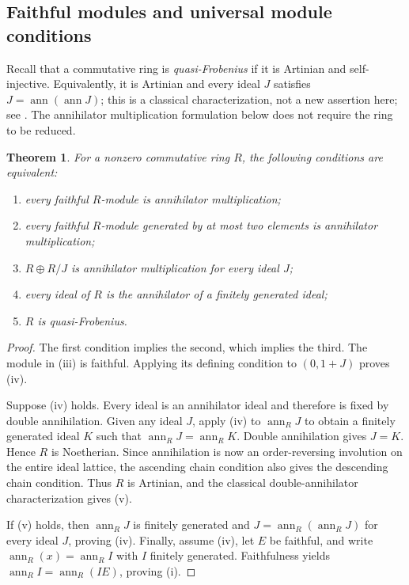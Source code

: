 \documentclass[11pt]{amsart}
\theoremstyle{plain}
\newtheorem{theorem}{Theorem}[section]
\theoremstyle{definition}
\theoremstyle{remark}
\newcommand{\ann}{\operatorname{ann}}
\numberwithin{equation}{section}
\begin{document}
\subsection{Faithful modules and universal module conditions}

Recall that a commutative ring is \emph{quasi-Frobenius} if it is
Artinian and self-injective. Equivalently, it is Artinian and every
ideal $J$ satisfies $J=\ann(\ann J)$; this is a classical
characterization, not a new assertion here; see \cite{Storrer69,Lam99}.
The annihilator multiplication formulation below does not require the
ring to be reduced.

\begin{theorem}\label{thm:faithful-qf}
For a nonzero commutative ring $R$, the following conditions are equivalent:
\begin{enumerate}[label=\textup{(\roman*)}]
\item every faithful $R$-module is annihilator multiplication;
\item every faithful $R$-module generated by at most two elements is
annihilator multiplication;
\item $R\oplus R/J$ is annihilator multiplication for every ideal $J$;
\item every ideal of $R$ is the annihilator of a finitely generated ideal;
\item $R$ is quasi-Frobenius.
\end{enumerate}
\end{theorem}

\begin{proof}
The first condition implies the second, which implies the third.
The module in (iii) is faithful. Applying its defining condition to
$(0,1+J)$ proves (iv).

Suppose (iv) holds. Every ideal is an annihilator ideal and therefore
is fixed by double annihilation. Given any ideal $J$, apply (iv) to
$\ann_R J$ to obtain a finitely generated ideal $K$ such that
$\ann_R J=\ann_R K$. Double annihilation gives $J=K$.
Hence $R$ is Noetherian. Since annihilation is now an order-reversing
involution on the entire ideal lattice, the ascending chain condition
also gives the descending chain condition. Thus $R$ is Artinian,
and the classical double-annihilator characterization gives (v).

If (v) holds, then $\ann_R J$ is finitely generated and
$J=\ann_R(\ann_R J)$ for every ideal $J$, proving (iv).
Finally, assume (iv), let $E$ be faithful, and write
$\ann_R(x)=\ann_R I$ with $I$ finitely generated.
Faithfulness yields $\ann_R I=\ann_R(IE)$, proving (i).
\end{proof}
\end{document}
